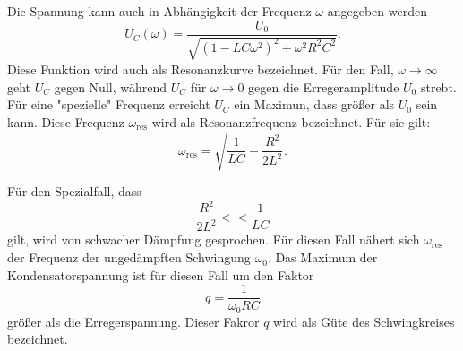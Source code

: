 Die Spannung kann auch in Abhängigkeit der Frequenz $\omega$ angegeben werden
\begin{equation}
  U_{C}(\omega)=\frac{U_{0}}{\sqrt{(1-LC\omega^2)^2+\omega^2R^2C^2}}.
\end{equation}
Diese Funktion wird auch als Resonanzkurve bezeichnet. Für den Fall,
$\omega \to \infty$ geht $U_{C}$ gegen Null, während $U_{C}$ für
$\omega \to 0$ gegen die Erregeramplitude $U_{0}$ strebt.
Für eine "spezielle" Frequenz erreicht $U_{C}$ ein Maximun, dass größer
als $U_{0}$ sein kann. Diese Frequenz $\omega_{\text{res}}$ wird als Resonanzfrequenz
bezeichnet. Für sie gilt:
\begin{equation}
  \omega_{\text{res}}=\sqrt{\frac{1}{LC}-\frac{R^2}{2L^2}}.
\end{equation}

Für den Spezialfall, dass
\begin{equation}
  \frac{R^2}{2L^2}<<\frac{1}{LC}
\end{equation}
gilt, wird von schwacher Dämpfung gesprochen. Für diesen Fall nähert sich
$\omega_{\text{res}}$ der Frequenz der ungedämpften Schwingung $\omega_{0}$.
Das Maximum der Kondensatorspannung ist für diesen Fall um den Faktor
\begin{equation}
  q=\frac{1}{\omega_{0}RC}
  \label{eqn:gute}
\end{equation}
größer als die Erregerspannung. Dieser Fakror $q$ wird als Güte des Schwingkreises
bezeichnet.



\label{sec:Theorie}

